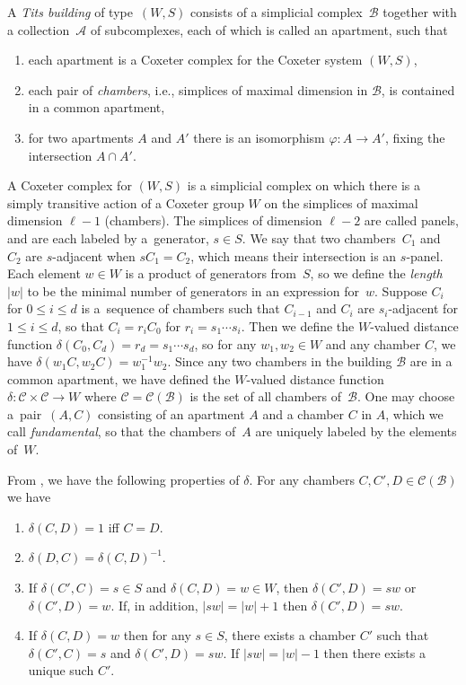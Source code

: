 \documentclass[11pt]{article}
\numberwithin{equation}{section}
\numberwithin{equation}{section}
\def\cA{\mathcal A}
\def\cB{\mathcal B}
\def\cC{\mathcal C}
\begin{document}
\begin{Definition} \label{definition:Tits_Building}A {\em Tits building} of type~$(W,S)$ consists of a simplicial complex~$\cB$ together with a collection~$\cA$ of subcomplexes,
each of which is called an apartment, such that
\begin{enumerate}\itemsep=0pt
 \item[1)] each apartment is a Coxeter complex for the Coxeter system $(W,S)$,
 \item[2)] each pair of {\em chambers}, i.e., simplices of maximal dimension in $\cB$, is contained in a common apartment,
 \item[3)] for two apartments $A$ and $A'$ there is an isomorphism $\varphi\colon A\rightarrow A'$, fixing the intersection $A\cap A'$.
\end{enumerate}
\end{Definition}
A Coxeter complex for $(W,S)$ is a simplicial complex on which there is a simply transitive action of a Coxeter group $W$ on
the simplices of maximal dimension $\ell -1$ (chambers). The simplices of dimension $\ell -2$ are called panels, and are
each labeled by a~generator, $s\in S$. We say that two chambers~$C_1$ and~$C_2$ are $s$-adjacent when $sC_1 = C_2$, which
means their intersection is an $s$-panel. Each element $w\in W$ is a product of generators from~$S$, so we define the {\it length}~$|w|$ to be the minimal number of generators in an expression for~$w$.
Suppose $C_i$ for $0\leq i\leq d$ is a~sequence of chambers such that $C_{i-1}$ and $C_i$ are
$s_i$-adjacent for $1\leq i\leq d$, so that $C_i = r_i C_0$ for $r_i = s_1\cdots s_i$. Then we define the $W$-valued distance function $\delta(C_0,C_d) = r_d = s_1\cdots s_d$, so for any $w_1,w_2\in W$ and any chamber $C$, we have $\delta(w_1 C,w_2 C) = w_1^{-1} w_2$. Since any two chambers in the building $\cB$ are in a common apartment, we have defined the $W$-valued distance function $\delta\colon \cC\times\cC\to W$ where $\cC = \cC(\cB)$ is the set of all chambers of~$\cB$.
One may choose a~pair~$(A,C)$ consisting of an apartment $A$ and a chamber $C$ in $A$, which we call {\it fundamental}, so that the chambers of~$A$ are uniquely labeled by the elements of~$W$.

From \cite[Proposition 4.84]{AbramenkoBrown08}, we have the following properties of $\delta$. For any chambers $C,C',D\in \cC(\cB)$ we have
\begin{enumerate}\itemsep=0pt
 \item $\delta(C,D) = 1$ iff $C = D$.
 \item $\delta(D,C) = \delta(C,D)^{-1}$.
 \item If $\delta(C',C) = s\in S$ and $\delta(C,D) = w\in W$, then $\delta(C',D) = sw$ or $\delta(C',D) = w$. If, in addition,
 $|sw| = |w| + 1$ then $\delta(C',D) = sw$.
 \item If $\delta(C,D) = w$ then for any $s\in S$, there exists a chamber $C'$ such that $\delta(C',C) = s$ and $\delta(C',D) = sw$.
 If $|sw| = |w| -1$ then there exists a unique such $C'$.
\end{enumerate}
\end{document}

